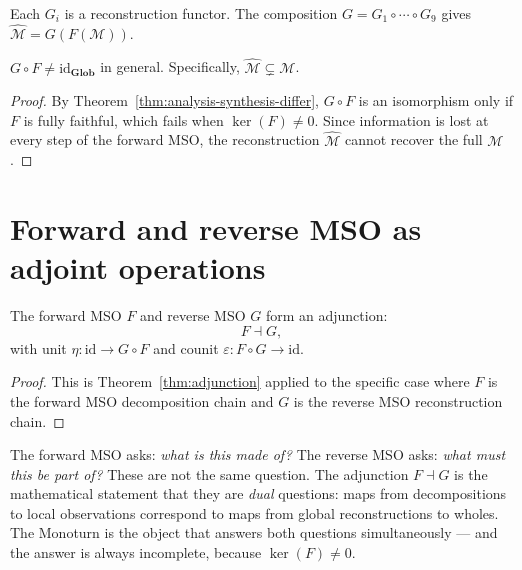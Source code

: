 Each $G_i$ is a reconstruction functor.
The composition $G = G_1 \circ \cdots \circ G_9$ gives
$\widehat{\mathcal{M}} = G(F(\mathcal{M}))$.

\begin{proposition}
  \label{prop:mso-not-inverse}
  \statusproven{}
  $G \circ F \neq \mathrm{id}_{\mathbf{Glob}}$ in general.
  Specifically, $\widehat{\mathcal{M}} \subsetneq \mathcal{M}$.
\end{proposition}

\begin{proof}
  By Theorem~\ref{thm:analysis-synthesis-differ}, $G \circ F$
  is an isomorphism only if $F$ is fully faithful, which fails
  when $\ker(F) \neq 0$.
  Since information is lost at every step of the forward MSO,
  the reconstruction $\widehat{\mathcal{M}}$ cannot recover
  the full $\mathcal{M}$.
\end{proof}

\section{Forward and reverse MSO as adjoint operations}

\begin{theorem}
  \label{thm:mso-adjunction}
  \statusproven{}
  The forward MSO $F$ and reverse MSO $G$ form an adjunction:
  \[
    F \dashv G,
  \]
  with unit $\eta : \mathrm{id} \to G \circ F$ and counit
  $\varepsilon : F \circ G \to \mathrm{id}$.
\end{theorem}

\begin{proof}
  This is Theorem~\ref{thm:adjunction} applied to the specific
  case where $F$ is the forward MSO decomposition chain and
  $G$ is the reverse MSO reconstruction chain.
\end{proof}

\begin{InterpBox}
  The forward MSO asks: \emph{what is this made of?}
  The reverse MSO asks: \emph{what must this be part of?}
  These are not the same question.
  The adjunction $F \dashv G$ is the mathematical statement
  that they are \emph{dual} questions: maps from decompositions
  to local observations correspond to maps from global
  reconstructions to wholes.
  The Monoturn is the object that answers both questions
  simultaneously --- and the answer is always incomplete,
  because $\ker(F) \neq 0$.
\end{InterpBox}

